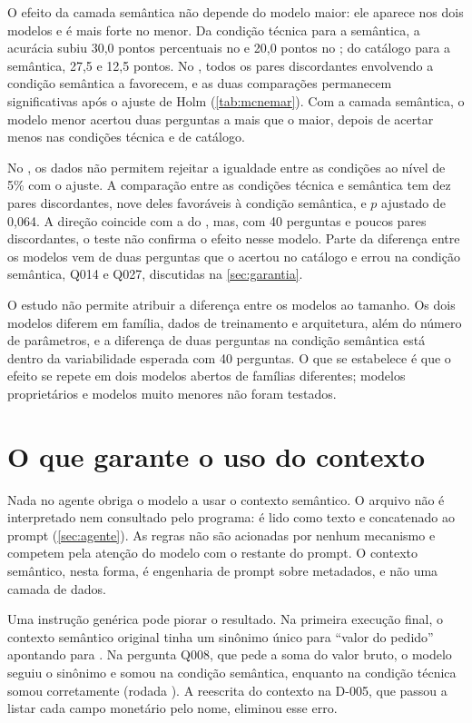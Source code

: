 O efeito da camada semântica não depende do modelo maior: ele aparece nos
dois modelos e é mais forte no menor. Da condição técnica para a
semântica, a acurácia subiu 30,0 pontos percentuais no
 e 20,0 pontos no ; do catálogo para a
semântica, 27,5 e 12,5 pontos. No , todos os pares
discordantes envolvendo a condição semântica a favorecem, e as duas
comparações permanecem significativas após o ajuste de Holm
(\autoref{tab:mcnemar}). Com a camada semântica, o modelo menor acertou
duas perguntas a mais que o maior, depois de acertar menos nas condições
técnica e de catálogo.

No , os dados não permitem rejeitar a igualdade entre as
condições ao nível de 5\% com o ajuste. A comparação entre as condições
técnica e semântica tem dez pares discordantes, nove deles favoráveis à
condição semântica, e $p$ ajustado de 0,064. A direção coincide com a do
, mas, com 40 perguntas e poucos pares discordantes, o
teste não confirma o efeito nesse modelo. Parte da diferença entre os
modelos vem de duas perguntas que o  acertou no catálogo
e errou na condição semântica, Q014 e Q027, discutidas na
\autoref{sec:garantia}.

O estudo não permite atribuir a diferença entre os modelos ao tamanho. Os
dois modelos diferem em família, dados de treinamento e arquitetura, além
do número de parâmetros, e a diferença de duas perguntas na condição
semântica está dentro da variabilidade esperada com 40 perguntas. O que se
estabelece é que o efeito se repete em dois modelos abertos de famílias
diferentes; modelos proprietários e modelos muito menores não foram
testados.

\section{O que garante o uso do contexto}
\label{sec:garantia}

Nada no agente obriga o modelo a usar o contexto semântico. O arquivo
 não é interpretado nem consultado pelo
programa: é lido como texto e concatenado ao prompt
(\autoref{sec:agente}). As regras não são acionadas por nenhum mecanismo e
competem pela atenção do modelo com o restante do prompt. O contexto
semântico, nesta forma, é engenharia de prompt sobre metadados, e não uma
camada de dados.

Uma instrução genérica pode piorar o resultado. Na primeira execução final,
o contexto semântico original tinha um sinônimo único para ``valor do
pedido'' apontando para . Na pergunta Q008, que
pede a soma do valor bruto, o modelo seguiu o sinônimo e somou
 na condição semântica, enquanto na condição técnica
somou corretamente  (rodada ). A reescrita
do contexto na D-005, que passou a listar cada campo monetário pelo nome,
eliminou esse erro.

